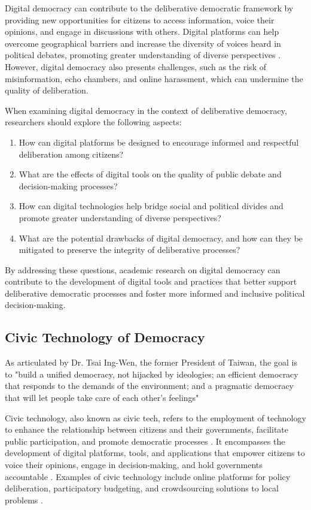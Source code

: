 \documentclass{IEEEtran}
\begin{document}
Digital democracy can contribute to the deliberative democratic framework by providing new opportunities for citizens to access information, voice their opinions, and engage in discussions with others. Digital platforms can help overcome geographical barriers and increase the diversity of voices heard in political debates, promoting greater understanding of diverse perspectives \cite{fishkin2009virtual}. However, digital democracy also presents challenges, such as the risk of misinformation, echo chambers, and online harassment, which can undermine the quality of deliberation.

When examining digital democracy in the context of deliberative democracy, researchers should explore the following aspects:

\begin{enumerate}
\item How can digital platforms be designed to encourage informed and respectful deliberation among citizens? 
\item What are the effects of digital tools on the quality of public debate and decision-making processes? 
\item How can digital technologies help bridge social and political divides and promote greater understanding of diverse perspectives?
\item What are the potential drawbacks of digital democracy, and how can they be mitigated to preserve the integrity of deliberative processes?
\end{enumerate}

By addressing these questions, academic research on digital democracy can contribute to the development of digital tools and practices that better support deliberative democratic processes and foster more informed and inclusive political decision-making.


\subsection{Civic Technology of Democracy}

As articulated by Dr. Tsai Ing-Wen, the former President of Taiwan, the goal is to "build a unified democracy, not hijacked by ideologies; an efficient democracy that responds to the demands of the environment; and a pragmatic democracy that will let people take care of each other's feelings" 

Civic technology, also known as civic tech, refers to the employment of technology to enhance the relationship between citizens and their governments, facilitate public participation, and promote democratic processes \cite{hollands2015civic}. It encompasses the development of digital platforms, tools, and applications that empower citizens to voice their opinions, engage in decision-making, and hold governments accountable \cite{susha2015civic}. Examples of civic technology include online platforms for policy deliberation, participatory budgeting, and crowdsourcing solutions to local problems \cite{schrock2016civic}.
\end{document}
